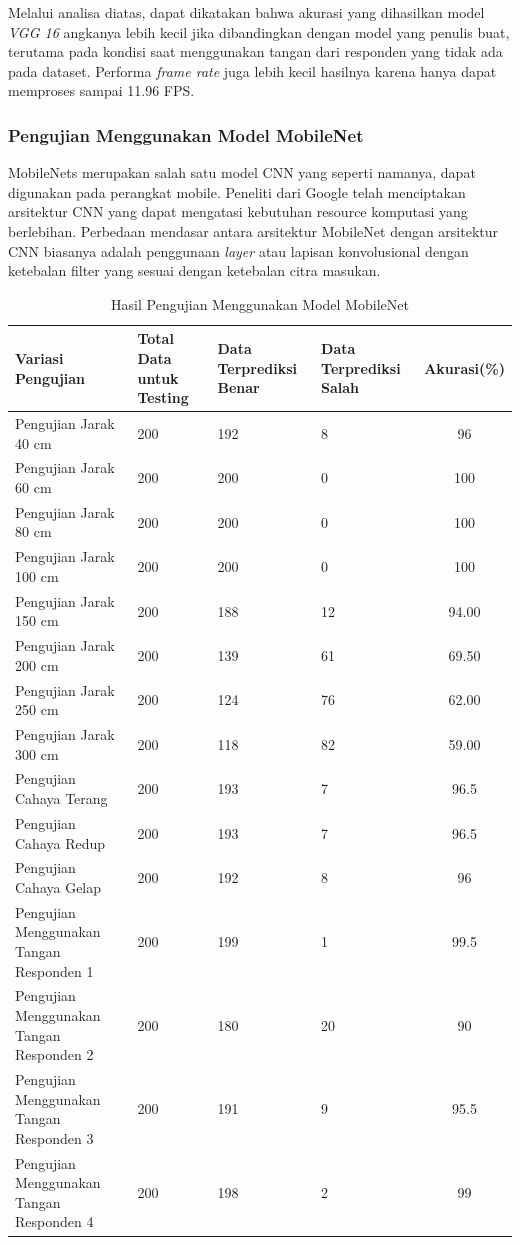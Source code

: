 Melalui analisa diatas, dapat dikatakan bahwa akurasi yang dihasilkan model \emph{VGG 16} angkanya lebih kecil jika dibandingkan dengan model yang penulis buat, terutama pada kondisi saat menggunakan tangan dari responden yang tidak ada pada dataset. Performa \emph{frame rate} juga lebih kecil hasilnya karena hanya dapat memproses sampai 11.96 FPS.

\subsubsection{Pengujian Menggunakan Model MobileNet}
\label{subsubsec:Pengujian Menggunakan Model MobileNet}

MobileNets merupakan salah satu model CNN yang seperti namanya, dapat digunakan pada perangkat mobile. Peneliti dari Google telah menciptakan arsitektur CNN yang dapat mengatasi kebutuhan resource komputasi yang berlebihan. Perbedaan mendasar antara arsitektur MobileNet dengan arsitektur CNN biasanya adalah penggunaan \emph{layer} atau lapisan konvolusional dengan ketebalan filter yang sesuai dengan ketebalan citra masukan.

\begin{longtable}[!htb]{|M{25mm}|M{30mm}|M{30mm}|M{30mm}|c|}
  \caption{Hasil Pengujian Menggunakan Model MobileNet}
  \label{tb:Hasil Pengujian Menggunakan Model MobileNet}\\
  \hline
  \textbf{Variasi Pengujian} & \textbf{Total Data untuk Testing} & \textbf{Data Terprediksi Benar} & \textbf{Data Terprediksi Salah} & \textbf{Akurasi(\%)} \\ 
  \hline
  \endhead
  Pengujian Jarak 40 cm & 200 & 192 & 8 & 96 \\ \hline
  Pengujian Jarak 60 cm & 200 & 200 & 0 & 100 \\ \hline
  Pengujian Jarak 80 cm & 200 & 200 & 0 & 100 \\ \hline
  Pengujian Jarak 100 cm & 200 & 200 & 0 & 100 \\ \hline
  Pengujian Jarak 150 cm & 200 & 188 & 12 & 94.00 \\ \hline
  Pengujian Jarak 200 cm & 200 & 139 & 61 & 69.50 \\ \hline
  Pengujian Jarak 250 cm & 200 & 124 & 76 & 62.00 \\ \hline
  Pengujian Jarak 300 cm & 200 & 118 & 82 & 59.00 \\ \hline
  Pengujian Cahaya Terang & 200 & 193 & 7 & 96.5 \\ \hline
  Pengujian Cahaya Redup & 200 & 193 & 7 & 96.5 \\ \hline
  Pengujian Cahaya Gelap & 200 & 192 & 8 & 96 \\ \hline
  Pengujian Menggunakan Tangan Responden 1 & 200 & 199 & 1 & 99.5 \\ \hline
  Pengujian Menggunakan Tangan Responden 2 & 200 & 180 & 20 & 90 \\ \hline
  Pengujian Menggunakan Tangan Responden 3 & 200 & 191 & 9 & 95.5 \\ \hline
  Pengujian Menggunakan Tangan Responden 4 & 200 & 198 & 2 & 99 \\ \hline
\end{longtable}

